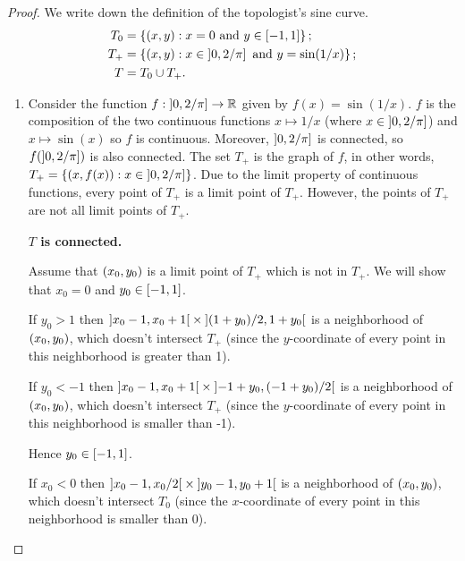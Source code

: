 \begin{proof}
	We write down the definition of the topologist's sine curve.
	\begin{align*}
		T_{0} & = \left\{{\left({x,y}\right) : x = 0 \text{ and } y \in \left[{-1,1}\right]}\right\};           \\
		T_{+} & = \left\{{\left({x,y}\right) : x \in \left]{0, 2/\pi}\right] \text{ and } y = \sin(1/x)}\right\}; \\
		T     & = T_{0} \cup T_{+}.
	\end{align*}
	\begin{enumerate}[label={(\alph*)}]
		\item Consider the function $f: \left]{0, 2/\pi}\right] \to \mathbb{R}$ given by $f(x) = \sin(1/x)$. $f$ is the composition of the two continuous functions $x\mapsto 1/x$ (where $x\in \left]{0, 2/\pi}\right]$) and $x\mapsto \sin(x)$ so $f$ is continuous. Moreover, $\left]{0, 2/\pi}\right]$ is connected, so $f(\left]{0, 2/\pi}\right])$ is also connected. The set $T_{+}$ is the graph of $f$, in other words, $T_{+} = \left\{{ (x, f(x)) : x\in\left]{0,2/\pi}\right] }\right\}$. Due to the limit property of continuous functions, every point of $T_{+}$ is a limit point of $T_{+}$. However, the points of $T_{+}$ are not all limit points of $T_{+}$.

		      \textbf{$T$ is connected.}

		      Assume that $\left({x_{0}, y_{0}}\right)$ is a limit point of $T_{+}$ which is not in $T_{+}$. We will show that $x_{0} = 0$ and $y_{0} \in \left[{-1,1}\right]$.

		      If $y_{0} > 1$ then $\left]{x_{0} - 1, x_{0} + 1}\right[ \times \left]{(1 + y_{0})/2, 1 + y_{0}}\right[$ is a neighborhood of $\left({x_{0}, y_{0}}\right)$, which doesn't intersect $T_{+}$ (since the $y$-coordinate of every point in this neighborhood is greater than 1).

		      If $y_{0} < -1$ then $\left]{x_{0} - 1, x_{0} + 1}\right[ \times \left]{-1 + y_{0}, (-1 + y_{0})/2}\right[$ is a neighborhood of $\left({x_{0}, y_{0}}\right)$, which doesn't intersect $T_{+}$ (since the $y$-coordinate of every point in this neighborhood is smaller than -1).

		      Hence $y_{0} \in \left[{-1,1}\right]$.

		      If $x_{0} < 0$ then $\left]{x_{0} - 1, x_{0}/2}\right[ \times \left]{y_{0} - 1, y_{0} + 1}\right[$ is a neighborhood of $\left({x_{0}, y_{0}}\right)$, which doesn't intersect $T_{0}$ (since the $x$-coordinate of every point in this neighborhood is smaller than 0).


\end{enumerate}
\end{proof}
